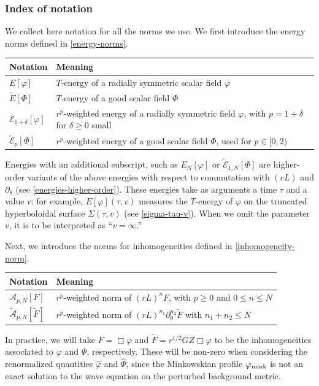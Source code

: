 \documentclass[10pt, reqno]{amsart}
\begin{document}
\subsubsection{Index of notation}
We collect here notation for all the norms we use. We first
introduce the energy norms defined in \cref{energy-norms}.
\begin{center}
\begin{tabular}{ll}
Notation & Meaning\\
\hline
\(E[\varphi{}]\) & \(T\)-energy of a radially symmetric scalar field \(\varphi{}\)\\
\(\tilde{E}[\Phi{}]\) & \(T\)-energy of a good scalar field \(\Phi{}\)\\
\(\mathcal{E}_{1 + \delta{}}[\varphi{}]\) & \(r^p\)-weighted energy of a radially symmetric field \(\varphi{}\), with \(p = 1 + \delta{}\) for \(\delta{}\ge 0\) small\\
\(\tilde{\mathcal{E}}_p[\Phi{}]\) & \(r^p\)-weighted energy of a good scalar field \(\Phi{}\), used for \(p\in [0,2)\)\\

\end{tabular}
\end{center}
Energies with an additional subscript, such as \(E_{N}[\varphi{}]\) or
\(\tilde{\mathcal{E}}_{1,N}[\Phi{}]\) are higher-order variants of the above
energies with respect to commutation with \((rL)\) and \(\partial_\theta{}\)
(see \cref{energies-higher-order}). These energies take as arguments a time
\(\tau{}\) and a value \(v\): for example, \(E[\varphi{}](\tau{},v)\) measures
the \(T\)-energy of \(\varphi{}\) on the truncated hyperboloidal surface
\(\Sigma{}(\tau{},v)\) (see \cref{sigma-tau-v}). When we omit the parameter \(v\),
it is to be interpreted as ``\(v = \infty\).''

Next, we introduce the norms for inhomogeneities defined in
\cref{inhomogeneity-norm}.
\begin{center}
\begin{tabular}{ll}
Notation & Meaning\\
\hline
\(\mathcal{A}_{p,N}[F]\) & \(r^p\)-weighted norm of \((rL)^{n}F\), with \(p\ge 0\) and \(0\le n\le N\)\\
\(\tilde{\mathcal{A}}_{p,N}[\tilde{F}]\) & \(r^p\)-weighted norm of \((rL)^{n_1}\partial{}_\theta^{n_2}\tilde{F}\) with \(n_1 + n_2\le N\)\\

\end{tabular}
\end{center}
In practice, we will take \(F = \Box{}\varphi{}\) and \(\tilde{F} = r^{1/2}GZ\Box{}\varphi{}\) to be the
inhomogeneities associated to \(\varphi{}\) and \(\Psi{}\), respectively. These
will be non-zero when considering the renormalized quantities
\(\widehat{\varphi{}}\) and \(\widehat{\Psi{}}\), since the Minkowskian profile
\(\varphi_{\textnormal{mink}}\) is not an exact solution to the wave equation on
the perturbed background metric.
\end{document}

